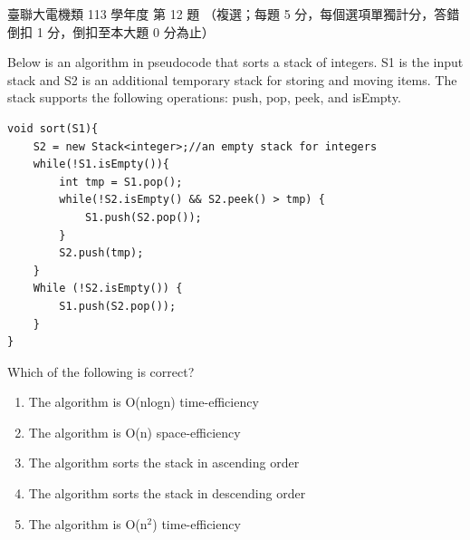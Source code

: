 \begin{pastexam}[label={px:ust-113-ee-ds-12}]{臺聯大電機類 113 學年度 第 12 題}
（複選；每題 5 分，每個選項單獨計分，答錯倒扣 1 分，倒扣至本大題 0 分為止）

Below is an algorithm in pseudocode that sorts a stack of integers. S1 is the input stack and S2 is
an additional temporary stack for storing and moving items. The stack supports the following
operations: push, pop, peek, and isEmpty.
\begin{verbatim}
void sort(S1){
    S2 = new Stack<integer>;//an empty stack for integers
    while(!S1.isEmpty()){
        int tmp = S1.pop();
        while(!S2.isEmpty() && S2.peek() > tmp) {
            S1.push(S2.pop());
        }
        S2.push(tmp);
    }
    While (!S2.isEmpty()) {
        S1.push(S2.pop());
    }
}
\end{verbatim}
Which of the following is correct?
\begin{enumerate}[label=(\Alph*)]
\item The algorithm is O(nlogn) time-efficiency
\item The algorithm is O(n) space-efficiency
\item The algorithm sorts the stack in ascending order
\item The algorithm sorts the stack in descending order
\item The algorithm is O(n$^2$) time-efficiency
\end{enumerate}
\end{pastexam}

